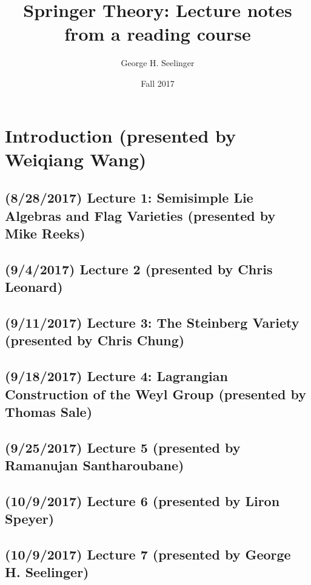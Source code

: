 \documentclass[11pt,leqno,oneside]{amsbook}
\title[Springer Theory]{Springer Theory: Lecture notes from a reading course}
\author{George H. Seelinger}
\date{Fall 2017}
\numberwithin{thm}{section}
\begin{document}
\maketitle
\pagebreak
\section{Introduction (presented by Weiqiang Wang)}
\subsection*{(8/28/2017) Lecture 1: Semisimple Lie Algebras and Flag Varieties (presented by Mike
  Reeks)}

\subsection*{(9/4/2017) Lecture 2 (presented by Chris Leonard)}

\subsection*{(9/11/2017) Lecture 3: The Steinberg Variety (presented
  by Chris Chung)}

\subsection*{(9/18/2017) Lecture 4: Lagrangian Construction of the
  Weyl Group (presented by Thomas Sale)}

\subsection*{(9/25/2017) Lecture 5 (presented by Ramanujan
  Santharoubane)}

\subsection*{(10/9/2017) Lecture 6 (presented by Liron Speyer)}
\subsection*{(10/9/2017) Lecture 7 (presented by George
  H. Seelinger)}

\begin{bibdiv}
  \begin{biblist}
  \end{biblist}
\end{bibdiv}
\end{document}
